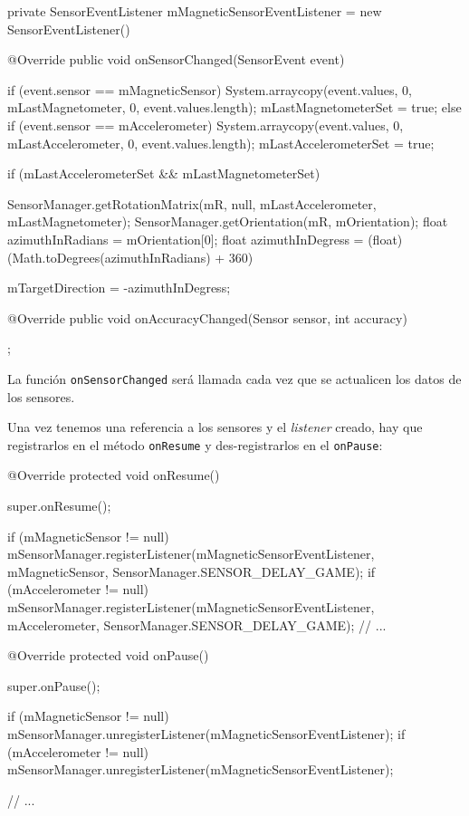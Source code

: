 \documentclass[	DIV=calc,%
							paper=a4,%
							fontsize=11pt]{scrartcl}	 					%
\begin{document}
\begin{javacode}
	private SensorEventListener mMagneticSensorEventListener = new SensorEventListener() {

			@Override
			public void onSensorChanged(SensorEvent event) {

					if (event.sensor == mMagneticSensor) {
							System.arraycopy(event.values, 0, mLastMagnetometer, 0, event.values.length);
							mLastMagnetometerSet = true;
					} else if (event.sensor == mAccelerometer) {
							System.arraycopy(event.values, 0, mLastAccelerometer, 0, event.values.length);
							mLastAccelerometerSet = true;
					}

					if (mLastAccelerometerSet && mLastMagnetometerSet) {
							SensorManager.getRotationMatrix(mR, null, mLastAccelerometer, mLastMagnetometer);
							SensorManager.getOrientation(mR, mOrientation);
							float azimuthInRadians = mOrientation[0];
							float azimuthInDegress = (float) (Math.toDegrees(azimuthInRadians) + 360) %

							mTargetDirection = -azimuthInDegress;
					}
			}

			@Override
			public void onAccuracyChanged(Sensor sensor, int accuracy) {
			}
	};
\end{javacode}

La función \texttt{onSensorChanged} será llamada cada vez que se
actualicen los datos de los sensores.

Una vez tenemos una referencia a los sensores y el \emph{listener}
creado, hay que registrarlos en el método \texttt{onResume} y
des-registrarlos en el \texttt{onPause}:

\begin{javacode}
	@Override
	protected void onResume() {
			super.onResume();

			if (mMagneticSensor != null) {
					mSensorManager.registerListener(mMagneticSensorEventListener, mMagneticSensor,
									SensorManager.SENSOR_DELAY_GAME);
			}
			if (mAccelerometer != null) {
					mSensorManager.registerListener(mMagneticSensorEventListener, mAccelerometer,
									SensorManager.SENSOR_DELAY_GAME);
			}
			// ...
	}

	@Override
	protected void onPause() {
			super.onPause();

			if (mMagneticSensor != null) {
					mSensorManager.unregisterListener(mMagneticSensorEventListener);
			}
			if (mAccelerometer != null) {
					mSensorManager.unregisterListener(mMagneticSensorEventListener);
			}

			// ...
	}
\end{javacode}
\end{document}
